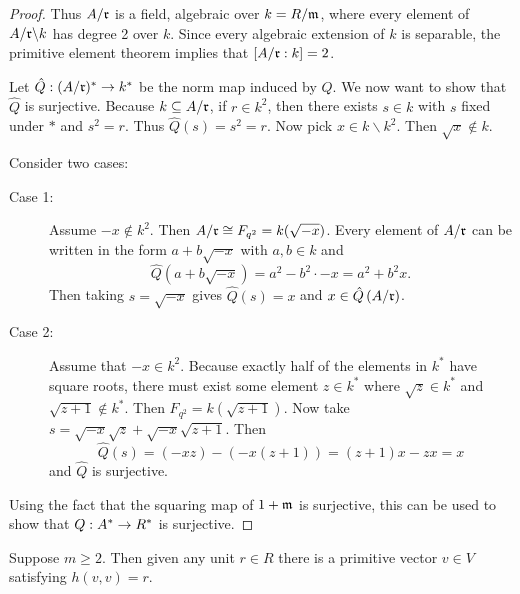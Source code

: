 \begin{proof}
Thus $A/\mathfrak{r}$ is a field, algebraic over $k = R/\mathfrak{m}$, where every element of $A/\mathfrak{r} \backslash k$ has degree 2 over $k$.
Since every algebraic extension of $k$ is separable, the primitive element theorem implies that $[A/\mathfrak{r} : k] = 2$.

Let $\hat{Q}: (A/\mathfrak{r})^* \to k^*$ be the norm map induced by $Q$.
We now want to show that $\hat{Q}$ is surjective.
Because $k \subseteq A/\mathfrak{r}$, if $r \in k^2$, then there exists $s \in k$ with $s$ fixed under $*$ and $s^2 = r$.
Thus $\hat{Q}(s) = s^2 = r$.
Now pick $x \in k \backslash k^2$.
Then $\sqrt{x} \not\in k$.

Consider two cases:
\begin{description}
\item[Case 1:] Assume $-x \not\in k^2$. Then $A/\mathfrak{r} \cong F_{q^2} = k(\sqrt{-x})$.
Every element of $A/\mathfrak{r}$ can be written in the form $a + b \sqrt{-x}$ with $a, b \in k$ and 
\[
\hat{Q}(a + b \sqrt{-x}) = a^2 - b^2 \cdot -x = a^2 + b^2x.
\]
Then taking $s = \sqrt{-x}$ gives $\hat{Q}{(s)} = x$ and $x \in \hat{Q}\left(A/\mathfrak{r}\right)$.
\item[Case 2:] Assume that $-x \in k^2$.
Because exactly half of the elements in $k^*$ have square roots, there must exist some element $z \in k^*$ where $\sqrt{z} \in k^*$ and $\sqrt{z+1} \not\in k^*$.
Then $F_{q^2} = k(\sqrt{z+1})$.
Now take $s = \sqrt{-x}\sqrt{z} + \sqrt{-x}\sqrt{z+1}$.
Then
\[
\hat{Q}(s) = (-xz) - (-x(z+1)) = (z+1)x - zx = x
\]
and $\hat{Q}$ is surjective.
\end{description}
Using the fact that the squaring map of $1 + \mathfrak{m}$ is surjective, this can be used to show that $Q: A^* \to R^*$ is surjective.
\end{proof}


\begin{proposition}\label{prop3.4}
Suppose $m \ge 2$.
Then given any unit $r \in R$ there is a primitive vector $v \in V$ satisfying $h(v,v) = r$.
\end{proposition}

